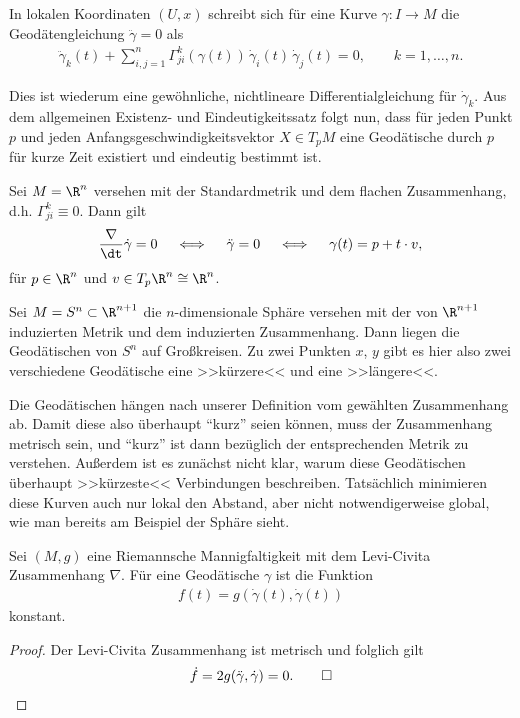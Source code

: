 \documentclass[%
	paper=a5,%
	fleqn,%
	DIV=18,%
	BCOR=0mm,
	fontsize=11pt,
	titlepage=false,%
	bibliography=totoc,
	DIV=18,%
	twoside=true,
	pdftitle=Riemannsche Geometrie,
	pdfauthor=Uwe Semmelmann,
	numbers=noendperiod]%
	{scrbook}
\begin{document}
\begin{rem}
In lokalen Koordinaten $(U,x)$ schreibt sich für eine
Kurve $\gamma\colon I\to M$ die Geodätengleichung $\ddot\gamma=0$  als
\begin{align*}
\ddot{\gamma}_k(t) + \sum_{i,j=1}^n \Gamma_{ji}^k (\gamma(t))\,
\dot{\gamma}_i(t)\, \dot{\gamma}_j(t) = 0,\qquad k=1,\ldots,n.
\end{align*}

Dies ist wiederum eine gewöhnliche, nichtlineare Differentialgleichung für
$\dot{\gamma}_{k}$. Aus dem allgemeinen Existenz- und Eindeutigkeitssatz folgt nun,
dass für jeden Punkt $p$ und jeden Anfangsgeschwindigkeitsvektor $X\in T_{p}M$ eine Geodätische durch $p$ für kurze Zeit existiert und eindeutig bestimmt ist.\map 
\end{rem}

\begin{ex}
\begin{exenum}
\item Sei $M=\R^n$ versehen mit der Standardmetrik und dem flachen
Zusammenhang, d.h. $\Gamma_{ji}^k \equiv 0$. Dann gilt
\begin{align*}
\frac{\nabla}{\dt} \dot\gamma = 0 \quad\iff\quad \ddot\gamma = 0 \quad\iff\quad
\gamma(t) = p+ t\cdot v,
\end{align*}
für $p\in \R^n$ und $v\in T_{p}\R^n \cong \R^n$.
\item Sei $M=S^n\subset\R^{n+1}$ die $n$-dimensionale Sphäre versehen mit der
von $\R^{n+1}$ induzierten Metrik und dem induzierten Zusammenhang. Dann liegen
die Geodätischen von $S^n$ auf Großkreisen. Zu zwei Punkten $x$, $y$ gibt es hier
also zwei verschiedene Geodätische eine >>kürzere<< und eine >>längere<<.\boxc
\end{exenum}
\end{ex}

Die Geodätischen hängen nach unserer Definition vom gewählten Zusammenhang ab. Damit diese also überhaupt ``kurz'' seien können, muss der Zusammenhang metrisch sein, und ``kurz'' ist dann bezüglich der entsprechenden Metrik zu verstehen.
Außerdem ist es zunächst nicht klar, warum diese Geodätischen überhaupt >>kürzeste<< Verbindungen
beschreiben. Tatsächlich minimieren diese Kurven auch nur lokal den Abstand,
aber nicht notwendigerweise global, wie man bereits am Beispiel der Sphäre
sieht.

\begin{lem}
Sei $(M,g)$ eine Riemannsche Mannigfaltigkeit mit dem Levi-Civita
Zusammenhang $\nabla$. Für eine Geodätische $\gamma$ ist die Funktion
\begin{align*}
f(t) = g(\dot{\gamma}(t),\dot{\gamma}(t))
\end{align*}
konstant.\fish
\end{lem}
\begin{proof}
Der Levi-Civita Zusammenhang ist metrisch und folglich gilt
\begin{align*}
\dot{f} = 2g(\ddot{\gamma},\dot\gamma) = 0.\qed
\end{align*}
\end{proof}
\end{document}
